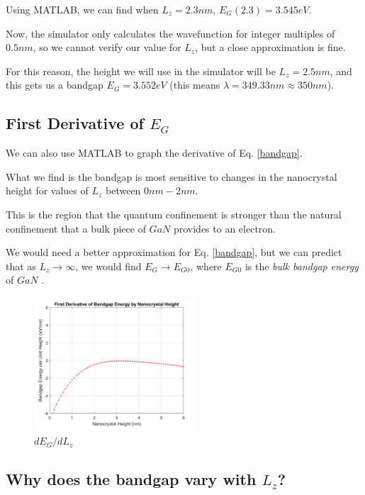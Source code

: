 \documentclass{IEEEtran}
\begin{document}
Using MATLAB, we can find when \(L_z = 2.3nm\), \(E_G(2.3) = 3.545eV\).

Now, the simulator only calculates the wavefunction for integer multiples of \(0.5nm\), so we cannot verify our value for \(L_z\), but a close approximation is fine. 

For this reason, the height we will use in the simulator will be \(L_z = 2.5nm\), and this gets us a bandgap \(E_G = 3.552eV\) (this means \(\lambda = 349.33nm \approx 350nm\)).




\subsection{First Derivative of \(E_G\)}

We can also use MATLAB to graph the derivative of Eq. \ref{bandgap}. 

What we find is the bandgap is most sensitive to changes in the nanocrystal height for values of \(L_z\) between \(0nm - 2nm\).

This is the region that the quantum confinement is stronger than the natural confinement that a bulk piece of \(GaN\) provides to an electron. 

We would need a better approximation for Eq. \ref{bandgap}, but we can predict that as \(L_z \to \infty\), we would find \(E_G \to E_{G0}\), where \(E_{G0}\) is the \textit{bulk bandgap energy} of \(GaN\) .



\begin{figure}[!h] 
    \centering
    \includegraphics*[width = 6cm]{derivativeOfEgVLz.png}
    \caption{\(dE_G / dL_z\)}
    \label{fig:derivative}
\end{figure}    

\subsection{Why does the bandgap vary with \( L_z \)?}
\end{document}
